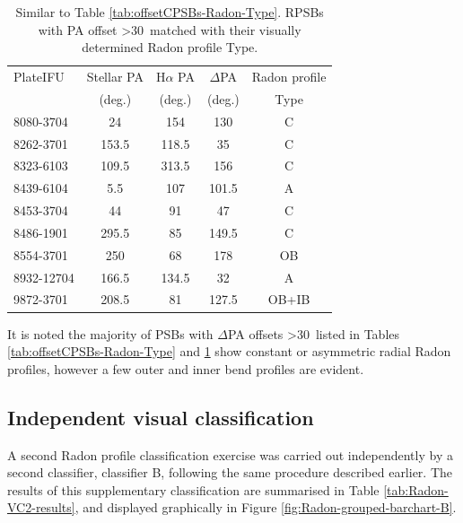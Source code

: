 \begin{table}
\centering
\caption[RPSBs with PA offset \textgreater 30\textdegree\ matched with their visually determined Radon profile Type]{Similar to Table \ref{tab:offsetCPSBs-Radon-Type}. RPSBs with PA offset \textgreater 30\textdegree\ matched with their visually determined Radon profile Type.}
\label{tab:offsetRPSBs-Radon-Type}
\begin{tabular}{lcccc}
\hline
PlateIFU   & Stellar PA & H$\alpha$ PA & $\Delta$PA & Radon profile \\
  & (deg.) & (deg.) & (deg.) & Type\\
\hline
8080-3704 & 24 & 154 & 130 & C \\
8262-3701 & 153.5 & 118.5 & 35 & C \\
8323-6103 & 109.5 & 313.5 & 156 & C \\
8439-6104 & 5.5 & 107 & 101.5 & A \\
8453-3704 & 44 & 91 & 47 & C \\
8486-1901 & 295.5 & 85 & 149.5 & C \\
8554-3701 & 250 & 68 & 178 & OB \\
8932-12704 & 166.5 & 134.5 & 32 & A \\
9872-3701 & 208.5 & 81 & 127.5 & OB+IB \\
\hline
\end{tabular}
\end{table}

It is noted the majority of PSBs with $\Delta$PA offsets \textgreater 30\textdegree\ listed in Tables \ref{tab:offsetCPSBs-Radon-Type} and \ref{tab:offsetRPSBs-Radon-Type} show constant or asymmetric radial Radon profiles, however a few outer and inner bend profiles are evident. 

\subsection{Independent visual classification}
\label{independent-classification}
A second Radon profile classification exercise was carried out independently by a second classifier, classifier B, following the same procedure described earlier. The results of this supplementary classification are summarised in Table \ref{tab:Radon-VC2-results}, and displayed graphically in Figure \ref{fig:Radon-grouped-barchart-B}. 

